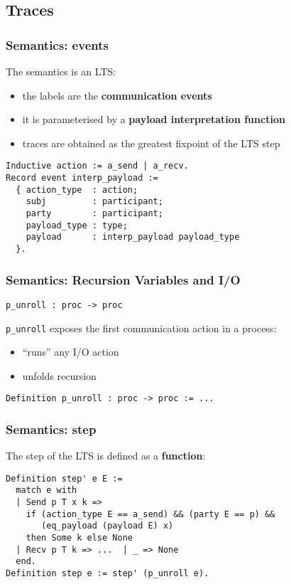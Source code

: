 \subsection{Traces}


\begin{frame}[fragile]
    \frametitle{Semantics: events}
    The semantics is an LTS: 
    \begin{itemize}
    \item the labels are the \textbf{communication events}
    \item it is parameterised by a \textbf{payload interpretation function}
    \item traces are obtained as the greatest fixpoint of the LTS step
    \end{itemize}
\vspace{.5cm}
    \begin{verbatim}
Inductive action := a_send | a_recv.
Record event interp_payload :=
  { action_type  : action;
    subj         : participant;
    party        : participant;
    payload_type : type;
    payload      : interp_payload payload_type
  }.
    \end{verbatim}
\end{frame}

\begin{frame}[fragile]
    \frametitle{Semantics: Recursion Variables and I/O}
    \verb|p_unroll : proc -> proc| 
\vspace{.2cm}

\verb|p_unroll| exposes the first communication action in a process:
\begin{itemize}
\item ``runs'' any I/O action
\item unfolds recursion
\end{itemize}
\vspace{1cm}
    \begin{verbatim}
Definition p_unroll : proc -> proc := ...
    \end{verbatim}
\end{frame}

\begin{frame}[fragile]
    \frametitle{Semantics: step}
The step of the LTS is defined as a \textbf{function}:
\vspace{.5cm}
    \begin{verbatim}
Definition step' e E :=
  match e with
  | Send p T x k =>
    if (action_type E == a_send) && (party E == p) &&
       (eq_payload (payload E) x)
    then Some k else None
  | Recv p T k => ...  | _ => None
  end.
Definition step e := step' (p_unroll e).
    \end{verbatim}
\end{frame}

